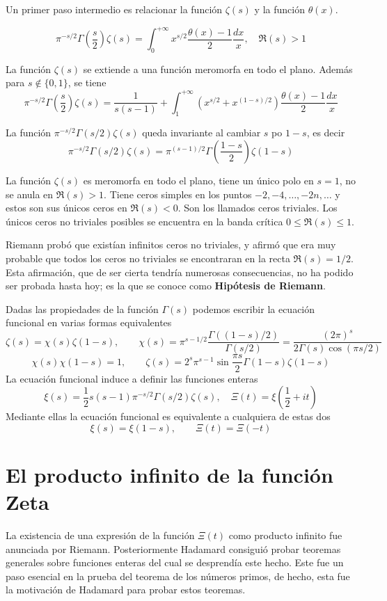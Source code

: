 \documentclass[TAN.tex]{subfiles}
\begin{document}
Un primer paso intermedio es relacionar la función $ζ(s)$ y la función $θ(x)$.
\begin{prop}
\[ π^{-s/2} Γ\left(\frac{s}{2}\right) ζ(s) = \int_0^{+∞} x^{s/2} \frac{θ(x)-1}{2} \frac{dx}{x}, \quad \Re(s) > 1 \]
\end{prop}
\begin{prop}
La función $ζ(s)$ se extiende a una función meromorfa en todo el plano.
Además para $s \notin \{0,1\}$, se tiene
\[ π^{-s/2} Γ\left(\frac{s}{2}\right) ζ(s) = \frac{1}{s(s-1)} + \int_1^{+∞} (x^{s/2}+x^{(1-s)/2})\frac{θ(x)-1}{2} \frac{dx}{x} \]
\end{prop}

\begin{teorema} La función $π^{-s/2} Γ(s/2) ζ(s)$ queda invariante al cambiar $s$ po $1-s$, es decir
\[ π^{-s/2} Γ(s/2) ζ(s) = π^{(s-1)/2} Γ\left(\frac{1-s}{2}\right) ζ(1-s) \]
\end{teorema}
\begin{coro}
La función $ζ(s)$ es meromorfa en todo el plano, tiene un único polo en $s = 1$, no se anula en $\Re(s) > 1$. Tiene ceros simples en los puntos $-2, -4, \dots, -2n, \dots$ y estos son sus únicos ceros en $\Re(s) < 0$. Son los llamados ceros triviales. Los únicos ceros no triviales posibles se encuentra en la banda crítica $0 ≤ \Re(s) ≤ 1$.
\end{coro}

Riemann probó que existían infinitos ceros no triviales, y afirmó que era muy probable que todos los ceros no triviales se encontraran en la recta $\Re(s)=1/2$. Esta afirmación, que de ser cierta tendría numerosas consecuencias, no ha podido ser probada hasta hoy; es la que se conoce como \textbf{Hipótesis de Riemann}.

Dadas las propiedades de la función $Γ(s)$ podemos escribir la ecuación funcional en varias formas equivalentes
\[ ζ(s) = χ(s)ζ(1-s), \qquad χ(s) = π^{s-1/2} \frac{Γ((1-s)/2)}{Γ(s/2)} = \frac{(2π)^s}{2Γ(s) \cos(πs/2)} \]
\[ χ(s)χ(1-s) = 1, \qquad ζ(s) = 2^sπ^{s-1} \sin \frac{πs}{2} Γ(1-s)ζ(1-s) \]
La ecuación funcional induce a definir las funciones enteras
\[ ξ(s) = \frac{1}{2} s(s-1)π^{-s/2}Γ(s/2) ζ(s), \quad Ξ(t)=ξ(\frac{1}{2}+it) \]
Mediante ellas la ecuación funcional es equivalente a cualquiera de estas dos
\[ ξ(s) = ξ(1-s), \qquad Ξ(t)=Ξ(-t) \]
\section{El producto infinito de la función Zeta}
La existencia de una expresión de la función $Ξ(t)$ como producto infinito fue anunciada por Riemann. Posteriormente Hadamard consiguió probar teoremas generales sobre funciones enteras del cual se desprendía este hecho. Este fue un paso esencial en la prueba del teorema de los números primos, de hecho, esta fue la motivación de Hadamard para probar estos teoremas.
\end{document}
